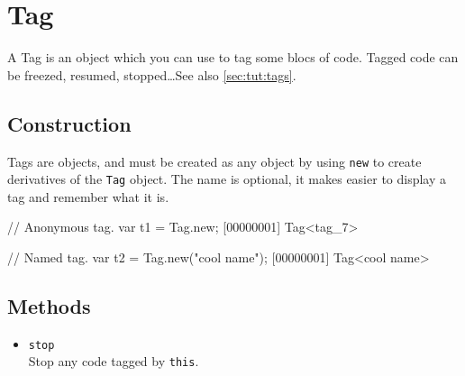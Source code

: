 \section{Tag}

A Tag is an object which you can use to tag some blocs of code.
Tagged code can be freezed, resumed, stopped\ldots See also
\autoref{sec:tut:tags}.

\subsection{Construction}
\label{stdlib:tag:ctor}

Tags are objects, and must be created as any object by using
\lstinline{new} to create derivatives of the \lstinline{Tag} object.
The name is optional, it makes easier to display a tag and remember
what it is.

\begin{urbiscript}
// Anonymous tag.
var t1 = Tag.new;
[00000001] Tag<tag_7>

// Named tag.
var t2 = Tag.new("cool name");
[00000001] Tag<cool name>
\end{urbiscript}


\subsection{Methods}
\begin{itemize}
\item \lstinline|stop|~\\
  Stop any code tagged by \lstinline|this|.
\end{itemize}

